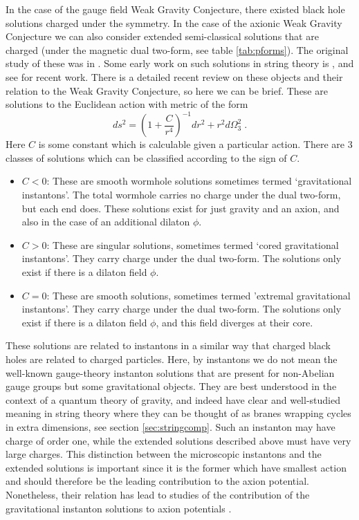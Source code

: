 \documentclass[11pt,a4paper]{article}
\numberwithin{equation}{section}
\numberwithin{table}{section}\setlength{\multlinegap}{25pt}
\newcommand{\be}{\begin{equation}}
\newcommand{\ee}{\end{equation}}
\begin{document}
In the case of the gauge field Weak Gravity Conjecture, there existed black hole solutions charged under the symmetry. In the case of the axionic Weak Gravity Conjecture we can also consider extended semi-classical solutions that are charged (under the magnetic dual two-form, see table \ref{tab:pforms}). The original study of these was in \cite{1988NuPhB.306..890G}. Some early work on such solutions in string theory is \cite{ArkaniHamed:2007js}, and see \cite{Hertog:2018kbz} for recent work. There is a detailed recent review \cite{Hebecker:2018ofv} on these objects and their relation to the Weak Gravity Conjecture, so here we can be brief. These are solutions to the Euclidean action with metric of the form
\be
ds^2 = \left(1+\frac{C}{r^4} \right)^{-1} dr^2 + r^2 d\Omega_3^2 \;.
\ee
Here $C$ is some constant which is calculable given a particular action. There are 3 classes of solutions which can be classified according to the sign of $C$.
\begin{itemize}
\item $C<0$\;: These are smooth wormhole solutions sometimes termed `gravitational instantons'. The total wormhole carries no charge under the dual two-form, but each end does. These solutions exist for just gravity and an axion, and also in the case of an additional dilaton $\phi$.
\item $C>0$\;: These are singular solutions, sometimes termed `cored gravitational instantons'. They carry charge under the dual two-form. The solutions only exist if there is a dilaton field $\phi$.   
\item $C=0$\;: These are smooth solutions, sometimes termed 'extremal gravitational instantons'. They carry charge under the dual two-form. The solutions only exist if there is a dilaton field $\phi$, and this field diverges at their core.
\end{itemize}

These solutions are related to instantons in a similar way that charged black holes are related to charged particles. Here, by instantons we do not mean the well-known gauge-theory instanton solutions that are present for non-Abelian gauge groups but some gravitational objects. They are best understood in the context of a quantum theory of gravity, and indeed have clear and well-studied meaning in string theory where they can be thought of as branes wrapping cycles in extra dimensions, see section \ref{sec:stringcomp}. Such an instanton may have charge of order one, while the extended solutions described above must have very large charges. This distinction between the microscopic instantons and the extended solutions is important since it is the former which have smallest action and should therefore be the leading contribution to the axion potential. Nonetheless, their relation has lead to studies of the contribution of the gravitational instanton solutions to axion potentials \cite{Montero:2015ofa,Hebecker:2016dsw}.
\end{document}
